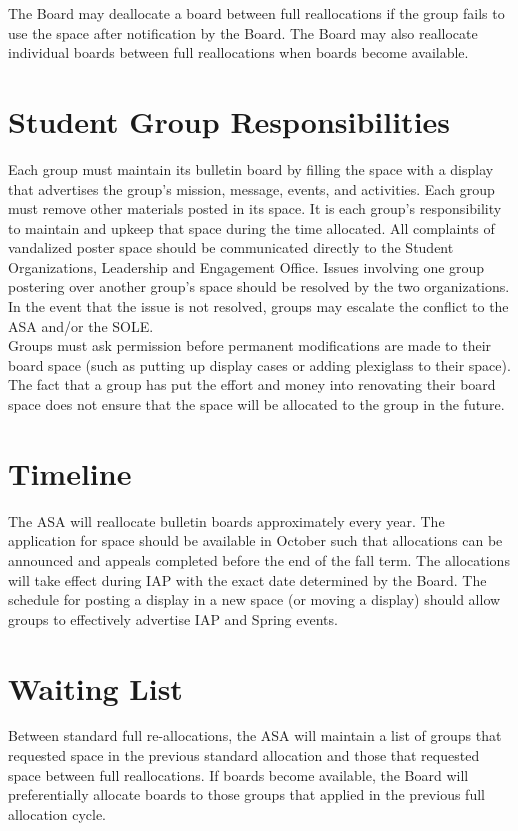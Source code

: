 \documentclass[12pt]{constitution}
\begin{document}
The Board may deallocate a board between full reallocations if the group fails to use the space after
    notification by the Board.
The Board may also reallocate individual boards between full reallocations when boards become available.

\section{Student Group Responsibilities}
Each group must maintain its bulletin board by filling the space with a display that advertises the group's
    mission, message, events, and activities.
Each group must remove other materials posted in its space.
It is each group's responsibility to maintain and upkeep that space during the time allocated.
All complaints of vandalized poster space should be communicated directly to the Student Organizations,
    Leadership and Engagement Office.
Issues involving one group postering over another group's space should be resolved by the two organizations.
In the event that the issue is not resolved, groups may escalate the conflict to the ASA and/or the SOLE.
\\

Groups must ask permission before permanent modifications are made to their board space (such as
    putting up display cases or adding plexiglass to their space).
The fact that a group has put the effort and money into renovating their board space does not ensure
    that the space will be allocated to the group in the future.

\section{Timeline}
The ASA will reallocate bulletin boards approximately every year.
The application for space should be available in October such that allocations can be announced and
    appeals completed before the end of the fall term.
The allocations will take effect during IAP with the exact date determined by the Board.
The schedule for posting a display in a new space (or moving a display) should allow groups to
    effectively advertise IAP and Spring events.

\section{Waiting List}
Between standard full re-allocations, the ASA will maintain a list of groups that requested space in the
    previous standard allocation and those that requested space between full reallocations.
If boards become available, the Board will preferentially allocate boards to those groups that applied in the
    previous full allocation cycle.
\end{document}
